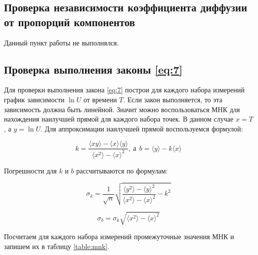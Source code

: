 \documentclass[a4paper,12pt]{article}
\begin{document}
\subsection{Проверка независимости коэффициента диффузии от пропорций компонентов}
\label{p:7}

Данный пункт работы не выполнялся.

\subsection{Проверка выполнения законы \eqref{eq:7}}

Для проверки выполнения закона \eqref{eq:7} построи для каждого набора измерений график зависимости $\ln{U}$ от времени $T$. Если закон выполняется, то эта зависимость должна быть линейной. Значит можно воспользоваться МНК для нахождения наилучшей прямой для каждого набора точек. В данном случае $x = T$, а $y = \ln{U}$. Для аппроксимации наилучшей прямой воспользуемся формулой:

\begin{equation}\label{eq:mnk}
    k = \frac{\langle xy\rangle - \langle x \rangle \langle y \rangle}{\langle x^2 \rangle - \langle x \rangle^2},
    \ \text{а} \ \  b = \langle y \rangle - k\langle x \rangle
\end{equation}

Погрешности для $k$ и $b$ рассчитываются по формулам:

\begin{equation}
    \sigma_k = \frac{1}{\sqrt{n}} \sqrt{\frac{\langle y^2 \rangle - \langle y \rangle^2}{\langle x^2 \rangle - \langle x \rangle^2} - k^2}
\end{equation}

\begin{equation}
    \sigma_b = \sigma_k\sqrt{\langle x^2 \rangle - \langle x \rangle^2}
\end{equation}

Посчитаем для каждого набора измерений промежуточные значения МНК и запишем их в таблицу \ref{table:mnk}.

\newpage
\end{document}

